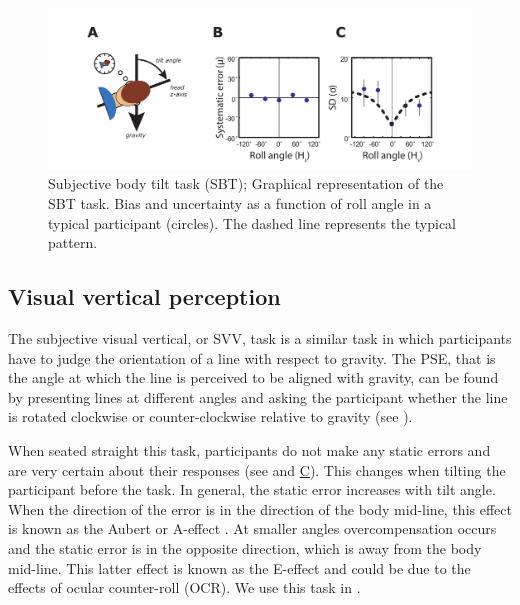 \begin{figure}
    \includegraphics[width=1.0\textwidth]{src/intro/figures/sbt.pdf}

    \caption{Subjective body tilt task (SBT);  Graphical representation of the SBT task.  Bias and  uncertainty as a function of roll angle in a typical participant (circles). The dashed line represents the typical pattern.}
    \label{intro:fig4}
\end{figure}


\subsection{Visual vertical perception}
The subjective visual vertical, or SVV, task is a similar task in which participants have to judge the orientation of a line with respect to gravity. The PSE, that is the angle at which the line is perceived to be aligned with gravity, can be found by presenting lines at different angles and asking the participant whether the line is rotated clockwise or counter-clockwise relative to gravity (see ).

When seated straight this task, participants do not make any static errors and are very certain about their responses (see  and \hyperref[intro:fig5]{C}). This changes when tilting the participant before the task. In general, the static error increases with tilt angle. When the direction of the error is in the direction of the body mid-line, this effect is known as the Aubert or A-effect \cite{aubert1861}. At smaller angles overcompensation occurs and the static error is in the opposite direction, which is away from the body mid-line. This latter effect is known as the E-effect and could be due to the effects of ocular counter-roll (OCR). We use this task in .

